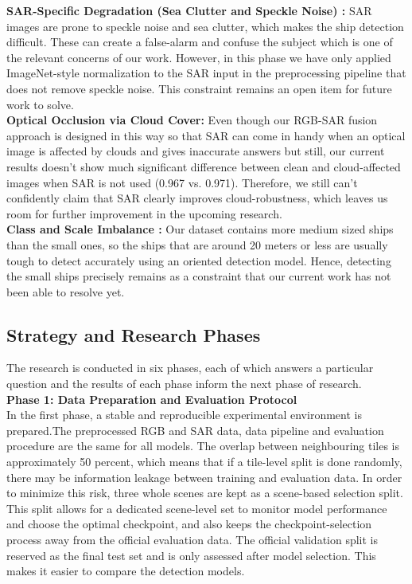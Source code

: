 \newpage
\textbf{SAR-Specific Degradation (Sea Clutter and Speckle Noise) :} SAR images are prone to speckle noise and sea clutter, which makes the ship detection difficult. These can create a false-alarm and confuse the subject which is one of the relevant concerns of our work.  However, in this  phase we have only applied ImageNet-style normalization to the SAR input in the  preprocessing pipeline  that does not remove speckle noise. This constraint remains an open item for future work to solve.\\

\textbf{Optical Occlusion via Cloud Cover:} Even though our RGB-SAR fusion approach is designed in this way so that SAR can come in handy when an optical image is affected by clouds and gives inaccurate answers but still, our current results doesn't show much significant difference between clean and cloud-affected images when SAR is not used (0.967 vs. 0.971). Therefore,  we still can’t confidently claim that SAR clearly improves cloud-robustness, which leaves us room for further improvement in the upcoming  research. \\

\textbf{Class and Scale Imbalance :} Our dataset contains more medium sized ships than the small ones, so the ships that are around 20 meters or less are usually tough to detect accurately using an oriented detection model. Hence, detecting the small ships precisely remains as a constraint that our current work has not been able to resolve yet.\\

\subsection{Strategy and Research Phases
}The research is conducted in six phases, each of which answers a particular question and the results of each phase inform the next phase of research.\\

\textbf{Phase 1: Data Preparation and Evaluation Protocol}\\
In the first phase, a stable and reproducible experimental environment is prepared.The preprocessed RGB and SAR data, data pipeline and evaluation procedure are the same for all models. The overlap between neighbouring tiles is approximately 50 percent, which means that if a tile-level split is done randomly, there may be information leakage between training and evaluation data. In order to minimize this risk, three whole scenes are kept as a scene-based selection split. This split allows for a dedicated scene-level set to monitor model performance and choose the optimal checkpoint, and also keeps the checkpoint-selection process away from the official evaluation data. The official validation split is reserved as the final test set and is only assessed after model selection. This makes it easier to compare the detection models.\\

